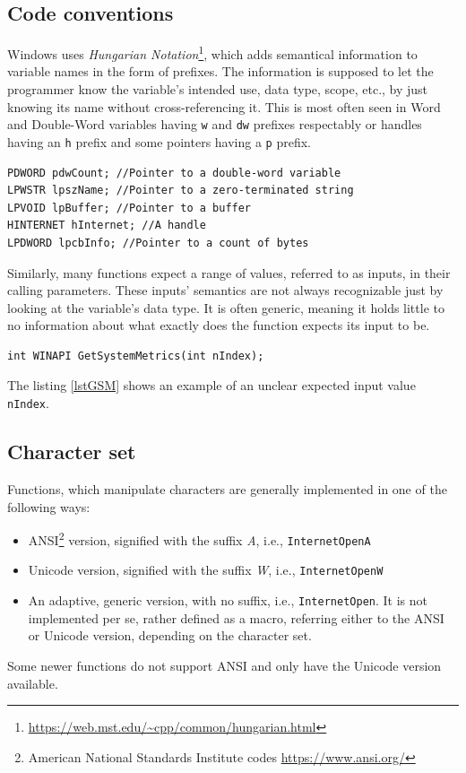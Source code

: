 \subsection*{Code conventions}
Windows uses \textit{Hungarian Notation}\footnote{\url{https://web.mst.edu/~cpp/common/hungarian.html}}, which adds semantical information to variable names in the form of prefixes. The information is supposed to let the programmer know the variable's intended use, data type, scope, etc., by just knowing its name without cross-referencing it. This is most often seen in Word and Double-Word variables having \lstinline{w} and \lstinline{dw} prefixes respectably or handles having an \lstinline{h} prefix and some pointers having a \lstinline{p} prefix.\cite{WinConventions}

\begin{lstlisting}[caption={An example of hungarian notation}]
PDWORD pdwCount; //Pointer to a double-word variable
LPWSTR lpszName; //Pointer to a zero-terminated string
LPVOID lpBuffer; //Pointer to a buffer
HINTERNET hInternet; //A handle
LPDWORD lpcbInfo; //Pointer to a count of bytes
\end{lstlisting}

Similarly, many functions expect a range of values, referred to as inputs, in their calling parameters. These inputs' semantics are not always recognizable just by looking at the variable's data type. It is often generic, meaning it holds little to no information about what exactly does the function expects its input to be.
\begin{lstlisting}[caption={GetSystemMetrics prototype},label=lstGSM]
int WINAPI GetSystemMetrics(int nIndex);
\end{lstlisting}
The listing \ref{lstGSM} shows an example of an unclear expected input value \lstinline{nIndex}.\cite{WinGetSM}

\subsection*{Character set}
Functions, which manipulate characters are generally implemented in one of the following ways:
\begin{itemize}
    \item ANSI\footnote{American National Standards Institute codes \url{https://www.ansi.org/}} version, signified with the suffix \textit{A}, i.e., \lstinline{InternetOpenA}
    \item Unicode version, signified with the suffix \textit{W}, i.e., \lstinline{InternetOpenW}
    \item An adaptive, generic version, with no suffix, i.e., \lstinline{InternetOpen}. It is not implemented per se, rather defined as a macro, referring either to the ANSI or Unicode version, depending on the character set.
\end{itemize}
Some newer functions do not support ANSI and only have the Unicode version available.\cite{WinUnicode}

